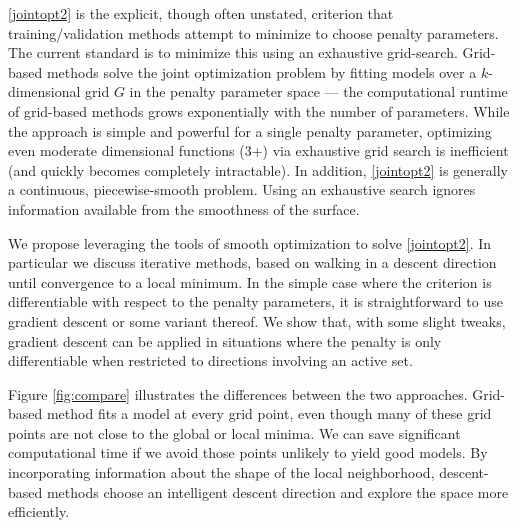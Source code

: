 \documentclass[10pt,letterpaper]{article}
\begin{document}

\eqref{jointopt2} is the explicit, though often unstated, criterion that training/validation methods attempt to minimize to choose penalty parameters. The current standard is to minimize this using an exhaustive grid-search. Grid-based methods solve the joint optimization problem by fitting models over a $k$-dimensional grid $G$ in the penalty parameter space --- the computational runtime of grid-based methods grows exponentially with the number of parameters. While the approach is simple and powerful for a single penalty parameter, optimizing even moderate dimensional functions (3+) via exhaustive grid search is inefficient (and quickly becomes completely intractable).  In addition, \eqref{jointopt2} is generally a continuous, piecewise-smooth problem. Using an exhaustive search ignores information available from the smoothness of the surface. 

We propose leveraging the tools of smooth optimization to solve \eqref{jointopt2}. In particular we discuss iterative methods, based on walking in a descent direction until convergence to a local minimum. In the simple case where the criterion is differentiable with respect to the penalty parameters, it is straightforward to use gradient descent or some variant thereof. We show that, with some slight tweaks, gradient descent can be applied in situations where the penalty is only differentiable when restricted to directions involving an active set.

Figure \ref{fig:compare} illustrates the differences between the two approaches. Grid-based method fits a model at every grid point, even though many of these grid points are not close to the global or local minima. We can save significant computational time if we avoid those points unlikely to yield good models. By incorporating information about the shape of the local neighborhood, descent-based methods choose an intelligent descent direction and explore the space more efficiently. 
\end{document}
